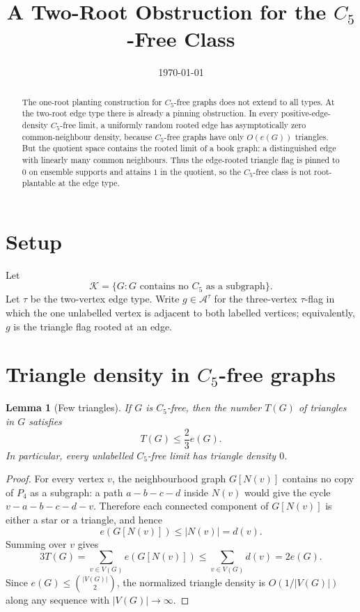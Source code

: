 \documentclass[11pt]{article}
\title{A Two-Root Obstruction for the \texorpdfstring{$C_5$}{C5}-Free Class}
\author{}
\date{\today}
\newtheorem{lemma}[theorem]{Lemma}
\theoremstyle{definition}
\newcommand{\A}{\mathcal A}
\newcommand{\K}{\mathcal K}
\begin{document}
\maketitle

\begin{abstract}
The one-root planting construction for $C_5$-free graphs does not extend to all
types.  At the two-root edge type there is already a pinning obstruction.  In
every positive-edge-density $C_5$-free limit, a uniformly random rooted edge has
asymptotically zero common-neighbour density, because $C_5$-free graphs have
only $O(e(G))$ triangles.  But the quotient space contains the rooted limit of
a book graph: a distinguished edge with linearly many common neighbours.  Thus
the edge-rooted triangle flag is pinned to $0$ on ensemble supports and attains
$1$ in the quotient, so the $C_5$-free class is not root-plantable at the edge
type.
\end{abstract}

\section{Setup}

Let
\[
  \K=\{G:\text{$G$ contains no $C_5$ as a subgraph}\}.
\]
Let $\tau$ be the two-vertex edge type.  Write $g\in\A^\tau$ for the
three-vertex $\tau$-flag in which the one unlabelled vertex is adjacent to both
labelled vertices; equivalently, $g$ is the triangle flag rooted at an edge.

\section{Triangle density in \texorpdfstring{$C_5$}{C5}-free graphs}

\begin{lemma}[Few triangles]\label{lem:few-triangles}
If $G$ is $C_5$-free, then the number $T(G)$ of triangles in $G$ satisfies
\[
  T(G)\le \frac23 e(G).
\]
In particular, every unlabelled $C_5$-free limit has triangle density $0$.
\end{lemma}

\begin{proof}
For every vertex $v$, the neighbourhood graph $G[N(v)]$ contains no copy of
$P_4$ as a subgraph: a path $a-b-c-d$ inside $N(v)$ would give the cycle
$v-a-b-c-d-v$.  Therefore each connected component of $G[N(v)]$ is either a
star or a triangle, and hence
\[
  e(G[N(v)])\le |N(v)|=d(v).
\]
Summing over $v$ gives
\[
  3T(G)=\sum_{v\in V(G)}e(G[N(v)])
  \le \sum_{v\in V(G)}d(v)=2e(G).
\]
Since $e(G)\le \binom{|V(G)|}{2}$, the normalized triangle density is
$O(1/|V(G)|)$ along any sequence with $|V(G)|\to\infty$.
\end{proof}
\end{document}
